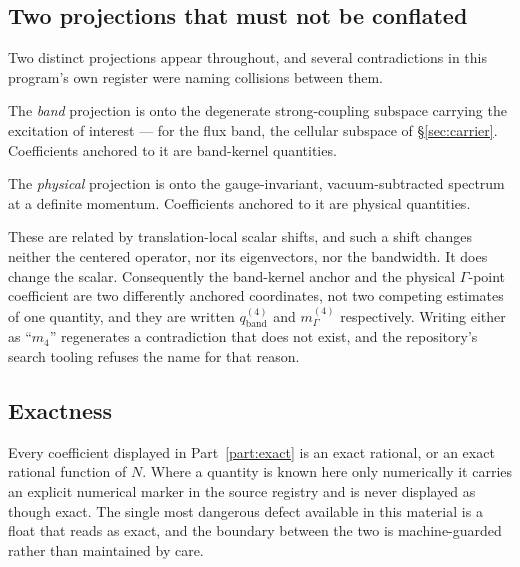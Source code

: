 \subsection{Two projections that must not be conflated}

Two distinct projections appear throughout, and several contradictions
in this program's own register were naming collisions between them.

The \emph{band} projection is onto the degenerate strong-coupling
subspace carrying the excitation of interest --- for the flux band, the
cellular subspace of \S\ref{sec:carrier}. Coefficients anchored to it
are band-kernel quantities.

The \emph{physical} projection is onto the gauge-invariant,
vacuum-subtracted spectrum at a definite momentum. Coefficients anchored
to it are physical quantities.

These are related by translation-local scalar shifts, and such a shift
changes neither the centered operator, nor its eigenvectors, nor the
bandwidth. It does change the scalar. Consequently the band-kernel
anchor and the physical $\Gamma$-point coefficient are two differently
anchored coordinates, not two competing estimates of one quantity, and
they are written $q^{(4)}_{\mathrm{band}}$ and $m^{(4)}_{\Gamma}$
respectively. Writing either as ``$m_4$'' regenerates a contradiction
that does not exist, and the repository's search tooling refuses the
name for that reason.

\subsection{Exactness}

Every coefficient displayed in Part~\ref{part:exact} is an exact
rational, or an exact rational function of $N$. Where a quantity is
known here only numerically it carries an explicit numerical marker in
the source registry and is never displayed as though exact. The single
most dangerous defect available in this material is a float that reads
as exact, and the boundary between the two is machine-guarded rather
than maintained by care.
